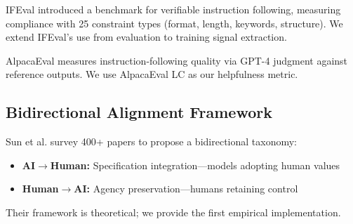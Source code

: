 IFEval \citep{zhou2023ifeval} introduced a benchmark for verifiable instruction following, measuring compliance with 25 constraint types (format, length, keywords, structure). We extend IFEval's use from evaluation to training signal extraction.

AlpacaEval \citep{dubois2024alpacaeval} measures instruction-following quality via GPT-4 judgment against reference outputs. We use AlpacaEval LC as our helpfulness metric.

\subsection{Bidirectional Alignment Framework}

Sun et al. \citep{sun2024bidirectional} survey 400+ papers to propose a bidirectional taxonomy:
\begin{itemize}
    \item \textbf{AI$\to$Human:} Specification integration---models adopting human values
    \item \textbf{Human$\to$AI:} Agency preservation---humans retaining control
\end{itemize}

Their framework is theoretical; we provide the first empirical implementation.
